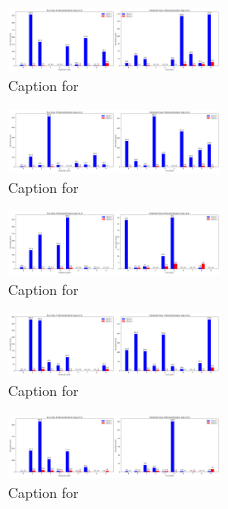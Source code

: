 \documentclass[12pt, a4paper]{article}
\begin{document}
\begin{figure}[ht]
\centering
\includegraphics[width=0.5\textwidth]{combined_class_boundary_pgd/combined_class_4_misclassifications_eps_0.4.png}
\caption{Caption for }
\label{fig:combined_class_4_misclassifications_eps_0.4.png}
\end{figure}

\begin{figure}[ht]
\centering
\includegraphics[width=0.5\textwidth]{combined_class_boundary_pgd/combined_class_5_misclassifications_eps_0.4.png}
\caption{Caption for }
\label{fig:combined_class_5_misclassifications_eps_0.4.png}
\end{figure}

\begin{figure}[ht]
\centering
\includegraphics[width=0.5\textwidth]{combined_class_boundary_pgd/combined_class_6_misclassifications_eps_0.4.png}
\caption{Caption for }
\label{fig:combined_class_6_misclassifications_eps_0.4.png}
\end{figure}


\begin{figure}[ht]
\centering
\includegraphics[width=0.5\textwidth]{combined_class_boundary_pgd/combined_class_7_misclassifications_eps_0.4.png}
\caption{Caption for }
\label{fig:combined_class_7_misclassifications_eps_0.4.png}
\end{figure}

\begin{figure}[ht]
\centering
\includegraphics[width=0.5\textwidth]{combined_class_boundary_pgd/combined_class_8_misclassifications_eps_0.4.png}
\caption{Caption for }
\label{fig:combined_class_8_misclassifications_eps_0.4.png}
\end{figure}
\end{document}
